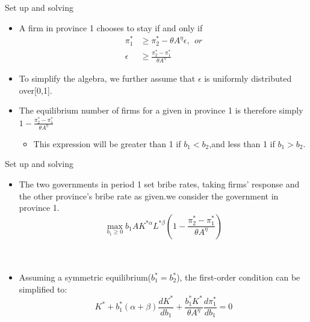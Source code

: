 \documentclass{beamer}
\begin{document}
\begin{frame}{Set up and solving}

\begin{itemize}
\item A firm in province 1 chooses to stay if and only if
\begin{align}
\pi _{1}^{*} & \geqslant \pi _{2}^{*}-\theta A^{\eta}\epsilon ,\ \ or  \\
\epsilon & \geqslant \frac{\pi _{2}^{*}-\pi _{1}^{*}}{\theta A^{\eta}}
\end{align}

\item To simplify the algebra, we further assume that  $\epsilon$ is uniformly distributed over[0,1].
\item The equilibrium number of firms for a given  in province 1 is therefore simply $1-\frac{\pi _{2}^{*}-\pi _{1}^{*}}{\theta A^{\eta}}$
\begin{itemize}
\item This expression will be greater than 1 if $ b_1<b_2 $,and less than 1 if  $ b_1>b_2 $.
\end{itemize}

\end{itemize}

\end{frame}

\begin{frame}{Set up and solving}

\begin{itemize}
\item The two governments in period 1 set bribe rates, taking firms' response and the other province's bribe rate as given.we consider the government in province 1.
\begin{equation}
\underset{b_1\geqslant 0}{\max}b_1AK^{*\alpha}L^{*\beta}\left( 1-\frac{\pi _{2}^{*}-\pi _{1}^{*}}{\theta A^{\eta}} \right) 
\end{equation}     \\~

\item Assuming a symmetric equilibrium($b_{1}^{*}=b_{2}^{*}$), the first-order condition can be simplified to:
\begin{equation}
K^*+b_{1}^{*}\left( \alpha +\beta \right) \frac{dK^*}{db_1}+\frac{b_{1}^{*}K^*}{\theta A^{\eta}}\frac{d\pi _{1}^{*}}{db_1}=0
\end{equation}

\end{itemize}

\end{frame}
\end{document}

